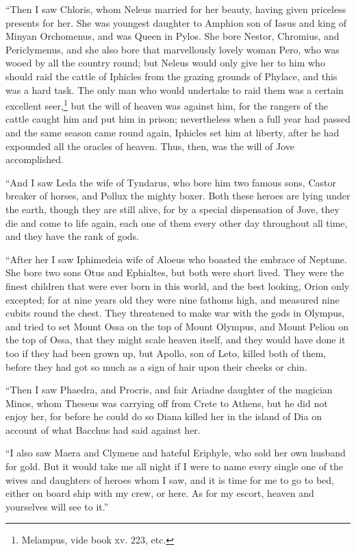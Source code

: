 “Then I saw Chloris, whom Neleus married for her beauty, having given priceless
presents for her. She was youngest daughter to Amphion son of Iasus and king of
Minyan Orchomenus, and was Queen in Pylos. She bore Nestor, Chromius, and
Periclymenus, and she also bore that marvellously lovely woman Pero, who was
wooed by all the country round; but Neleus would only give her to him who
should raid the cattle of Iphicles from the grazing grounds of Phylace, and
this was a hard task. The only man who would undertake to raid them was a
certain excellent seer,\footnote{Melampus, vide book xv. 223, etc.} but the will of heaven was against
him, for the rangers of the cattle caught him and put him in prison;
nevertheless when a full year had passed and the same season came round again,
Iphicles set him at liberty, after he had expounded all the oracles of heaven.
Thus, then, was the will of Jove accomplished.

“And I saw Leda the wife of Tyndarus, who bore him two famous sons, Castor
breaker of horses, and Pollux the mighty boxer. Both these heroes are lying
under the earth, though they are still alive, for by a special dispensation of
Jove, they die and come to life again, each one of them every other day
throughout all time, and they have the rank of gods.

“After her I saw Iphimedeia wife of Aloeus who boasted the embrace of Neptune.
She bore two sons Otus and Ephialtes, but both were short lived. They were the
finest children that were ever born in this world, and the best looking, Orion
only excepted; for at nine years old they were nine fathoms high, and measured
nine cubits round the chest. They threatened to make war with the gods in
Olympus, and tried to set Mount Ossa on the top of Mount Olympus, and Mount
Pelion on the top of Ossa, that they might scale heaven itself, and they would
have done it too if they had been grown up, but Apollo, son of Leto, killed
both of them, before they had got so much as a sign of hair upon their cheeks
or chin.

“Then I saw Phaedra, and Procris, and fair Ariadne daughter of the magician
Minos, whom Theseus was carrying off from Crete to Athens, but he did not enjoy
her, for before he could do so Diana killed her in the island of Dia on account
of what Bacchus had said against her.

“I also saw Maera and Clymene and hateful Eriphyle, who sold her own husband
for gold. But it would take me all night if I were to name every single one of
the wives and daughters of heroes whom I saw, and it is time for me to go to
bed, either on board ship with my crew, or here. As for my escort, heaven and
yourselves will see to it.”

